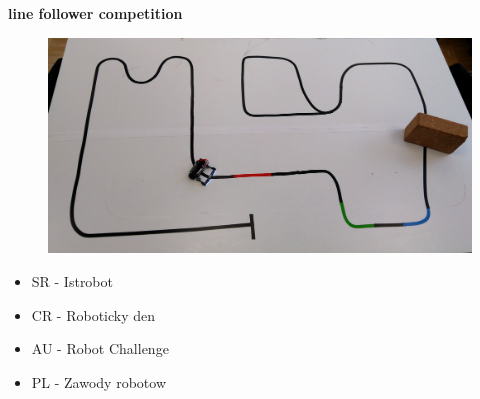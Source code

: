 \documentclass[xcolor=dvipsnames]{beamer}
\begin{document}
\begin{frame}{\bf line follower competition}


\begin{figure}
    \includegraphics[scale=0.07]{../images/line_follower.jpg}
\end{figure}

\begin{itemize}
    \item SR - Istrobot
    \item CR - Roboticky den
    \item AU - Robot Challenge
    \item PL - Zawody robotow
\end{itemize}


\end{frame}
\end{document}
